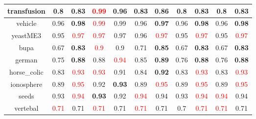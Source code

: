\documentclass{article}%
\begin{document}
\begin{tabular}{c|cccccccccc}
\hline%
transfusion&0.8&\textbf{0.83}&\textcolor{red}{ 
0.99
}&0.96&0.83&\textbf{0.86}&0.8&\textbf{0.83}&0.8&\textbf{0.83}\\%
\hline%
vehicle&0.96&\textbf{0.98}&\textcolor{red}{ 
0.99
}&0.99&0.96&\textbf{0.97}&0.96&\textbf{0.98}&0.96&\textbf{0.98}\\%
\hline%
yeastME3&0.95&\textcolor{red}{ 
0.97
}&\textcolor{red}{ 
0.97
}&0.97&0.96&\textcolor{red}{ 
0.97
}&0.95&\textcolor{red}{ 
0.97
}&0.95&\textcolor{red}{ 
0.97
}\\%
\hline%
bupa&0.67&\textbf{0.83}&\textcolor{red}{ 
0.9
}&0.9&0.71&\textbf{0.85}&0.67&\textbf{0.83}&0.67&\textbf{0.83}\\%
\hline%
german&0.75&\textbf{0.88}&0.88&\textcolor{red}{ 
0.94
}&0.85&\textbf{0.89}&0.76&\textbf{0.88}&0.76&\textbf{0.88}\\%
\hline%
horse\_colic&0.83&\textcolor{red}{ 
0.93
}&\textcolor{red}{ 
0.93
}&0.91&0.84&\textbf{0.92}&0.83&\textcolor{red}{ 
0.93
}&0.83&\textcolor{red}{ 
0.93
}\\%
\hline%
ionosphere&0.89&\textcolor{red}{ 
0.95
}&0.92&\textbf{0.93}&0.89&\textcolor{red}{ 
0.95
}&0.89&\textcolor{red}{ 
0.95
}&0.89&\textcolor{red}{ 
0.95
}\\%
\hline%
seeds&0.93&\textcolor{red}{ 
0.94
}&\textbf{0.93}&0.92&\textcolor{red}{ 
0.94
}&0.94&0.93&\textcolor{red}{ 
0.94
}&\textcolor{red}{ 
0.94
}&0.94\\%
\hline%
vertebal&\textcolor{red}{ 
0.71
}&0.71&\textcolor{red}{ 
0.71
}&0.71&\textcolor{red}{ 
0.71
}&0.71&0.7&\textcolor{red}{ 
0.71
}&\textcolor{red}{ 
0.71
}&0.71\\%
\hline%
\end{tabular}

%
\end{document}
